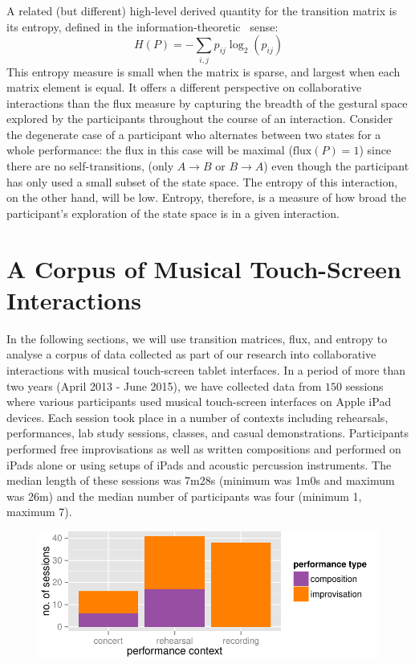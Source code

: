\documentclass{sigchi}
\begin{document}
A related (but different) high-level derived quantity for the
transition matrix is its entropy, defined in the
information-theoretic~\cite{Shannon:1948rt} sense:
\begin{equation}
  H(P) = -\sum_{i,j}p_{ij}\log_2(p_{ij})
\end{equation}
This entropy measure is small when the matrix is sparse, and largest
when each matrix element is equal. It offers a different perspective
on collaborative interactions than the flux measure by capturing the
breadth of the gestural space explored by the participants throughout
the course of an interaction. Consider the degenerate case of a
participant who alternates between two states for a whole performance:
the flux in this case will be maximal ($\mathrm{flux}(P) = 1$) since
there are no self-transitions, (only $A \rightarrow B$ or
$ B \rightarrow A$) even though the participant has only used a small
subset of the state space. The entropy of this interaction,
on the other hand, will be low. Entropy, therefore, is a measure of
how broad the participant's exploration of the state space is in a given
interaction.

\section{A Corpus of Musical Touch-Screen Interactions}

In the following sections, we will use transition matrices, flux, and
entropy to analyse a corpus of data collected as part of our research
into collaborative interactions with musical touch-screen tablet
interfaces. In a period of more than two years (April 2013 - June 2015), we have
collected data from $150$ sessions where various participants used
musical touch-screen interfaces on Apple iPad devices. Each session
took place in a number of contexts including rehearsals, performances, lab study
sessions, classes, and casual demonstrations. Participants performed
free improvisations as well as written compositions and performed on
iPads alone or using setups of iPads and acoustic percussion
instruments. The median length of these sessions was 7m28s (minimum was
1m0s and maximum was 26m) and the
median number of participants was four (minimum 1, maximum 7).

\begin{figure}
  \centering
  \includegraphics[width=\linewidth]{figures/sessions-count}
  \caption{
    \label{fig:count-data}}
\end{figure}
\end{document}
